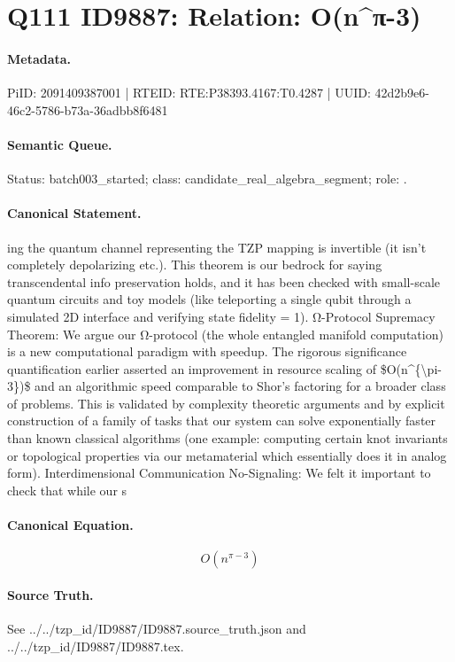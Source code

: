\section*{Q111 ID9887: Relation: O(n\textasciicircum{}π-3)}
\paragraph{Metadata.}
PiID: 2091409387001 | RTEID: RTE:P38393.4167:T0.4287 | UUID: 42d2b9e6-46c2-5786-b73a-36adbb8f6481

\paragraph{Semantic Queue.}
Status: batch003\_started; class: candidate\_real\_algebra\_segment; role: .

\paragraph{Canonical Statement.}
ing the quantum channel representing the TZP mapping is invertible (it isn’t completely depolarizing etc.). This theorem is our bedrock for saying transcendental info preservation holds, and it has been checked with small-scale quantum circuits and toy models (like teleporting a single qubit through a simulated 2D interface and verifying state fidelity = 1). Ω-Protocol Supremacy Theorem: We argue our Ω-protocol (the whole entangled manifold computation) is a new computational paradigm with speedup. The rigorous significance quantification earlier asserted an improvement in resource scaling of \$O(n\textasciicircum{}\{\textbackslash{}pi-3\})\$ and an algorithmic speed comparable to Shor’s factoring for a broader class of problems. This is validated by complexity theoretic arguments and by explicit construction of a family of tasks that our system can solve exponentially faster than known classical algorithms (one example: computing certain knot invariants or topological properties via our metamaterial which essentially does it in analog form). Interdimensional Communication No-Signaling: We felt it important to check that while our s

\paragraph{Canonical Equation.}
\[
O(n^{\pi-3})
\]

\paragraph{Source Truth.}
See ../../tzp\_id/ID9887/ID9887.source\_truth.json and ../../tzp\_id/ID9887/ID9887.tex.
